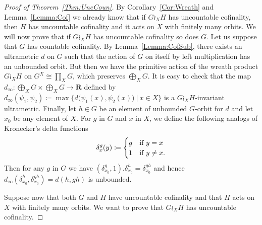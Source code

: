 \documentclass[a4paper]{article}
\theoremstyle{definition}
\newcommand*{\field}[1]{\mathbf{#1}}
\newcommand*{\R}{\field{R}}
\newcommand{\setst}[2]{\{#1\ |\ #2\}}
\begin{document}
%
%
\begin{proof}[Proof of Theorem~\ref{Thm:UncCoun}]
By Corollary~\ref{Cor:Wreath} and Lemma~\ref{Lemma:Cof} we already know that if $G \wr_X H$ has uncountable cofinality, then $H$ has uncountable cofinality and it acts on $X$ with finitely many orbits.
We will now prove that if $G \wr_X H$ has uncountable cofinality so does $G$.
Let us suppose that $G$ has countable cofinality. By Lemma~\ref{Lemma:CofSub}, there exists an ultrametric $d$ on $G$ such that the action of $G$ on itself by left multiplication has an unbounded orbit.
But then we have the primitive action of the wreath product $G\wr_XH$ on $G^X\cong\prod_XG$, which preserves $\bigoplus_XG$.
It is easy to check that the map $d_\infty\colon\bigoplus_XG\times\bigoplus_XG\to\R$ defined by $d_\infty(\psi_1,\psi_2)\coloneqq\max\setst{d\bigl(\psi_1(x),\psi_2(x)\bigr)}{x\in X}$ is a $G\wr_XH$-invariant ultrametric.
Finally, let $h\in G$ be an element of unbounded $G$-orbit for $d$ and let $x_0$ be any element of $X$.
For $g$ in $G$ and $x$ in $X$, we define the following analogs of Kronecker's delta functions
\begin{equation*}
\delta_x^g (y) \coloneqq
\begin{cases}
g & \textnormal{if }y = x \\
1 & \textnormal{if } y \neq x.
\end{cases}
\end{equation*}
Then for any $g$ in $G$ we have $(\delta_{x_0}^g,1).\delta_{x_0}^h=\delta_{x_0}^{gh}$ and hence $d_\infty(\delta_{x_0}^h,\delta_{x_0}^{gh})=d(h,gh)$ is unbounded.

Suppose now that both $G$ and $H$ have uncountable cofinality and that $H$ acts on $X$ with finitely many orbits. We want to prove that $G\wr_XH$ has uncountable cofinality.


\end{proof}
\end{document}
